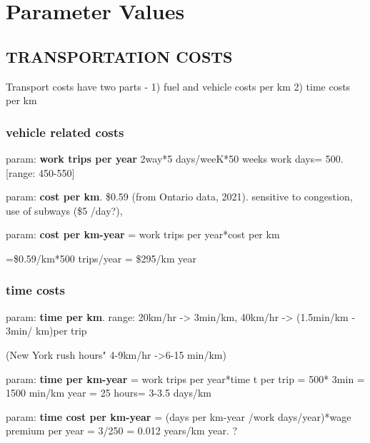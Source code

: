 \chapter[Parameters]{Parameter Values}
\label{AppendixA}
  
    
    
    
 

\section{TRANSPORTATION COSTS}
Transport costs have two parts -  
1) fuel and vehicle costs per km
2) time costs per km


\subsection{vehicle related costs}
param: \textbf{work trips per year} 2way*5 days/weeK*50 weeks work days= 500. [range: 450-550]


param: \textbf{cost per km}. \$0.59   (from  Ontario data, 2021). sensitive to congestion, use of subways (\$5 /day?), 

param: \textbf{cost per km-year} = work trips per year*cost per km

=\$0.59/km*500 trips/year  =  \$295/km year 

\subsection{time costs}
param: \textbf{time per km}. range: 20km/hr -> 3min/km, 40km/hr -> (1.5min/km - 3min/ km)per trip 



(New York rush hours" 4-9km/hr ->6-15 min/km)


param: \textbf{time  per km-year} = work trips per year*time t per trip = 500* 3min  = 1500 min/km year = 25 hours= 3-3.5 days/km
 
param: \textbf{time cost per km-year} =  (days per km-year /work days/year)*wage premium per year  = 3/250 = 0.012 years/km year. ?


